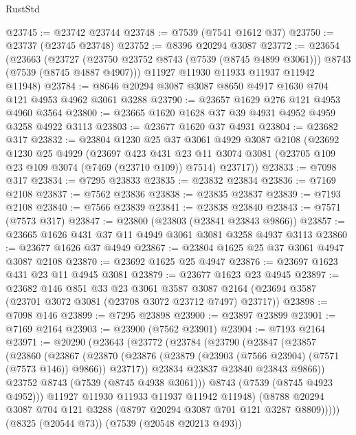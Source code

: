 \begin{lexlean}{RustStd}
\begin{coremodule}
@23745 := @23742 @23744
@23748 := @7539 (@7541 @1612 @37)
@23750 := @23737 (@23745 @23748)
@23752 := @8396 @20294 @3087
@23772 := @23654
    (@23663
      (@23727 (@23750 @23752 @8743 (@7539 (@8745 @4899 @3061))) @8743 (@7539 (@8745 @4887 @4907)))
      @11927
      @11930
      @11933
      @11937
      @11942
      @11948)
@23784 := @8646 @20294 @3087 @3087 @8650 @4917 @1630 @704 @121 @4953 @4962 @3061 @3288
@23790 := @23657 @1629 @276 @121 @4953 @4960 @3564
@23800 := @23665 @1620 @1628 @37 @39 @4931 @4952 @4959 @3258 @4922 @3113
@23803 := @23677 @1620 @37 @4931
@23804 := @23682 @317
@23832 := @23804
    @1230
    @25
    @37
    @3061
    @4929
    @3087
    @2108
    (@23692
      @1230
      @25
      @4929
      (@23697
        @423
        @431
        @23
        @11
        @3074
        @3081
        (@23705 @109 @23 @109 @3074 (@7469 (@23710 @109)) @7514)
        @23717))
@23833 := @7098 @317
@23834 := @7295 @23833
@23835 := @23832 @23834
@23836 := @7169 @2108
@23837 := @7562 @23836
@23838 := @23835 @23837
@23839 := @7193 @2108
@23840 := @7566 @23839
@23841 := @23838 @23840
@23843 := @7571 (@7573 @317)
@23847 := @23800 (@23803 (@23841 @23843 @9866))
@23857 := @23665 @1626 @431 @37 @11 @4949 @3061 @3081 @3258 @4937 @3113
@23860 := @23677 @1626 @37 @4949
@23867 := @23804 @1625 @25 @37 @3061 @4947 @3087 @2108
@23870 := @23692 @1625 @25 @4947
@23876 := @23697 @1623 @431 @23 @11 @4945 @3081
@23879 := @23677 @1623 @23 @4945
@23897 := @23682
    @146
    @851
    @33
    @23
    @3061
    @3587
    @3087
    @2164
    (@23694 @3587 (@23701 @3072 @3081 (@23708 @3072 @23712 @7497) @23717))
@23898 := @7098 @146
@23899 := @7295 @23898
@23900 := @23897 @23899
@23901 := @7169 @2164
@23903 := @23900 (@7562 @23901)
@23904 := @7193 @2164
@23971 := @20290
    (@23643
      (@23772
        (@23784
          (@23790
            (@23847
              (@23857
                (@23860
                  (@23867
                    (@23870
                      (@23876 (@23879 (@23903 (@7566 @23904) (@7571 (@7573 @146)) @9866)) @23717))
                    @23834
                    @23837
                    @23840
                    @23843
                    @9866))
                @23752
                @8743
                (@7539 (@8745 @4938 @3061)))
              @8743
              (@7539 (@8745 @4923 @4952)))
            @11927
            @11930
            @11933
            @11937
            @11942
            @11948)
          (@8788 @20294 @3087 @704 @121 @3288 (@8797 @20294 @3087 @701 @121 @3287 @8809)))))
    (@8325 (@20544 @73))
    (@7539 (@20548 @20213 @493))

\end{coremodule}
\end{lexlean}
